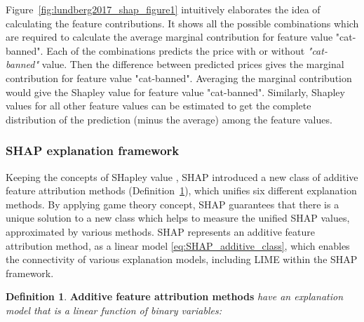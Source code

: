 \documentclass[english]{tktltiki2}
\theoremstyle{definition}
\newtheorem{definition}[thm]{Definition}
\theoremstyle{remark}
\begin{document}

Figure~\ref{fig:lundberg2017_shap_figure1} intuitively elaborates the idea of calculating the feature contributions. It shows all the possible combinations which are required to calculate the average marginal contribution for feature value "cat-banned". Each of the combinations predicts the price with or without \textit{"cat-banned"} value. Then the difference between predicted prices gives the marginal contribution for feature value "cat-banned".  Averaging the marginal contribution would give the Shapley value for feature value "cat-banned".  Similarly, Shapley values for all other feature values can be estimated to get the complete distribution of the prediction (minus the average) among the feature values.


\subsubsection{SHAP explanation framework} %
Keeping the concepts of SHapley value \citep{shapley1953value}, SHAP \citep{lundberg2017unified} introduced a new class of additive feature attribution methods (Definition~\ref{def:SHAP_additive_class}), which unifies six different explanation methods. By applying game theory concept, SHAP guarantees that there is a unique solution to a new class which helps to measure the unified SHAP values, approximated by various methods. SHAP represents an additive feature attribution method, as a linear model \eqref{eq:SHAP_additive_class}, which enables the connectivity of various explanation models, including LIME \citep{ribeiro2016should} within the SHAP framework.

\begin{definition}\label{def:SHAP_additive_class}{\textbf{Additive feature attribution methods} \textit{have an explanation model that is a linear
function of binary variables:}}
\end{definition}
\end{document}
